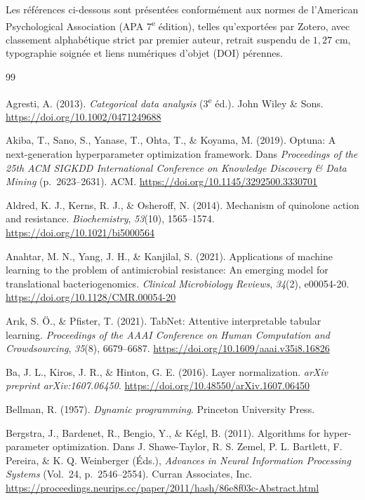 \documentclass[11pt,a4paper]{article}
\begin{document}
Les références ci-dessous sont présentées conformément aux normes de l'American Psychological Association (APA 7\textsuperscript{e} édition), telles qu'exportées par Zotero, avec classement alphabétique strict par premier auteur, retrait suspendu de $1,27\text{ cm}$, typographie soignée et liens numériques d'objet (DOI) pérennes.

\begin{thebibliography}{99}

Agresti, A. (2013). \textit{Categorical data analysis} (3\textsuperscript{e} éd.). John Wiley \& Sons. \url{https://doi.org/10.1002/0471249688}

Akiba, T., Sano, S., Yanase, T., Ohta, T., \& Koyama, M. (2019). Optuna: A next-generation hyperparameter optimization framework. Dans \textit{Proceedings of the 25th ACM SIGKDD International Conference on Knowledge Discovery \& Data Mining} (p.~2623--2631). ACM. \url{https://doi.org/10.1145/3292500.3330701}

Aldred, K. J., Kerns, R. J., \& Osheroff, N. (2014). Mechanism of quinolone action and resistance. \textit{Biochemistry}, \textit{53}(10), 1565--1574. \url{https://doi.org/10.1021/bi5000564}

Anahtar, M. N., Yang, J. H., \& Kanjilal, S. (2021). Applications of machine learning to the problem of antimicrobial resistance: An emerging model for translational bacteriogenomics. \textit{Clinical Microbiology Reviews}, \textit{34}(2), e00054-20. \url{https://doi.org/10.1128/CMR.00054-20}

Ar{\i}k, S. {\"O}., \& Pfister, T. (2021). TabNet: Attentive interpretable tabular learning. \textit{Proceedings of the AAAI Conference on Human Computation and Crowdsourcing}, \textit{35}(8), 6679--6687. \url{https://doi.org/10.1609/aaai.v35i8.16826}

Ba, J. L., Kiros, J. R., \& Hinton, G. E. (2016). Layer normalization. \textit{arXiv preprint arXiv:1607.06450}. \url{https://doi.org/10.48550/arXiv.1607.06450}

Bellman, R. (1957). \textit{Dynamic programming}. Princeton University Press.

Bergstra, J., Bardenet, R., Bengio, Y., \& K{\'e}gl, B. (2011). Algorithms for hyper-parameter optimization. Dans J. Shawe-Taylor, R. S. Zemel, P. L. Bartlett, F. Pereira, \& K. Q. Weinberger (Éds.), \textit{Advances in Neural Information Processing Systems} (Vol.~24, p.~2546--2554). Curran Associates, Inc. \url{https://proceedings.neurips.cc/paper/2011/hash/86e8f03c-Abstract.html}


\end{thebibliography}
\end{document}

